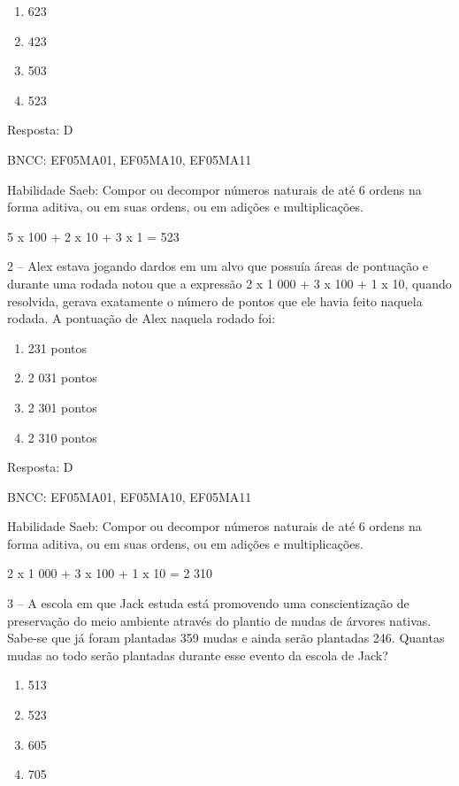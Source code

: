 \begin{enumerate}
\def\labelenumi{\alph{enumi})}
\item
  623
\item
  423
\item
  503
\item
  523
\end{enumerate}

Resposta: D

BNCC: EF05MA01, EF05MA10, EF05MA11

Habilidade Saeb: Compor ou decompor números naturais de até 6 ordens na
forma aditiva, ou em suas ordens, ou em adições e multiplicações.

5 x 100 + 2 x 10 + 3 x 1 = 523

2 -- Alex estava jogando dardos em um alvo que possuía áreas de
pontuação e durante uma rodada notou que a expressão 2 x 1 000 + 3 x 100
+ 1 x 10, quando resolvida, gerava exatamente o número de pontos que ele
havia feito naquela rodada. A pontuação de Alex naquela rodado foi:

\begin{enumerate}
\def\labelenumi{\alph{enumi})}
\item
  231 pontos
\item
  2 031 pontos
\item
  2 301 pontos
\item
  2 310 pontos
\end{enumerate}

Resposta: D

BNCC: EF05MA01, EF05MA10, EF05MA11

Habilidade Saeb: Compor ou decompor números naturais de até 6 ordens na
forma aditiva, ou em suas ordens, ou em adições e multiplicações.

2 x 1 000 + 3 x 100 + 1 x 10 = 2 310

3 -- A escola em que Jack estuda está promovendo uma conscientização de
preservação do meio ambiente através do plantio de mudas de árvores
nativas. Sabe-se que já foram plantadas 359 mudas e ainda serão
plantadas 246. Quantas mudas ao todo serão plantadas durante esse evento
da escola de Jack?

\begin{enumerate}
\def\labelenumi{\alph{enumi})}
\item
  513
\item
  523
\item
  605
\item
  705
\end{enumerate}


